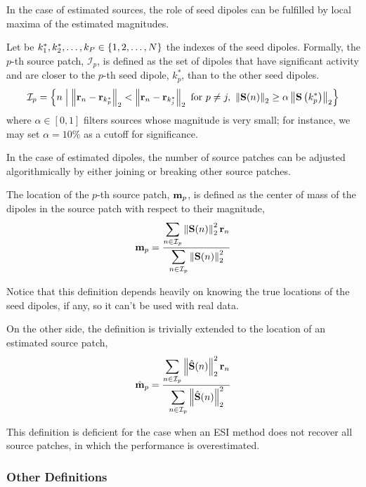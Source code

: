 In the case of estimated sources, the role of seed dipoles can be fulfilled by local maxima of the estimated magnitudes.

Let be $k_1^*, k_2^*, \dots, k_{P} \in \left\{ 1, 2, \dots, N \right\}$ the indexes of the seed dipoles.
%
Formally, the $p$-th source patch, $\mathcal{I}_p$, is defined as the set of dipoles that have significant activity and are closer to the $p$-th seed dipole, $k_p^*$, than to the other seed dipoles.
%
\begin{equation}
    \mathcal{I}_p = 
    \left\{ n 
    \;\middle|\;
    \left\lVert \mathbf{r}_n-\mathbf{r}_{k_p^*} \right\rVert_2 < \left\lVert \mathbf{r}_n-\mathbf{r}_{k_j^*} \right\rVert_2
    \text{ for } p\neq j,
    \,\,
    \left\lVert \mathbf{S}(n) \right\rVert_2 \geq 
    \alpha \left\lVert \mathbf{S} \left( k_p^* \right) \right\rVert_2
     \right\}
\end{equation}
where $\alpha\in [0,1]$ filters sources whose magnitude is very small;
%
for instance, we may set $\alpha = 10\%$ as a cutoff for significance.

In the case of estimated dipoles, the number of source patches can be adjusted algorithmically by either joining or breaking other source patches.

The location of the $p$-th source patch, $\mathbf{m}_p$, is defined as the center of mass of the dipoles in the source patch with respect to their magnitude,
\begin{equation}
    \mathbf{m}_p = 
\frac{\displaystyle \sum_{n\in \mathcal{I}_p} \left\lVert {\mathbf{S}}(n) \right\rVert_2^2 \mathbf{r}_n }{\displaystyle \sum_{n\in \mathcal{I}_p} \left\lVert {\mathbf{S}}(n) \right\rVert_2^2}
\end{equation}

Notice that this definition depends heavily on knowing the true locations of the seed dipoles, if any, so it can't be used with real data.

On the other side, the definition is trivially extended to the location of an estimated source patch,
\begin{equation}
    \hat{\mathbf{m}}_p = 
\frac{\displaystyle \sum_{n\in \mathcal{I}_p} \left\lVert \hat{\mathbf{S}}(n) \right\rVert_2^2 \mathbf{r}_n }{\displaystyle \sum_{n\in \mathcal{I}_p} \left\lVert \hat{\mathbf{S}}(n) \right\rVert_2^2}
\end{equation}

This definition is deficient for the case when an ESI method does not recover all source patches, in which the performance is overestimated.

\subsubsection{Other Definitions}

